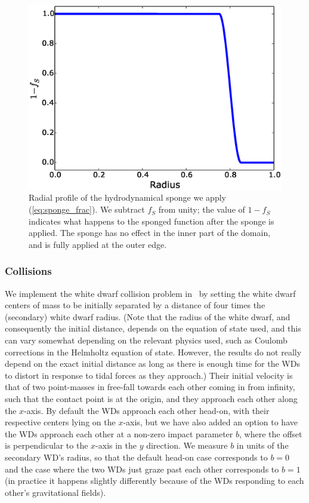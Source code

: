 \documentclass[12pt]{article}
\begin{document}
\begin{figure}
  \centering
  \includegraphics[scale=0.8]{plots/sponge}
  \caption[Radial profile of the hydrodynamical sponge]
          {Radial profile of the hydrodynamical sponge we apply (\autoref{eq:sponge_frac}). 
           We subtract $f_S$ from unity; the value of $1 - f_S$ indicates what happens 
           to the sponged function after the sponge is applied. The sponge has no effect 
           in the inner part of the domain, and is fully applied at the outer edge.
           \label{fig:sponge}
          }
\end{figure}


\clearpage
\subsubsection{Collisions}
\label{sec:initial_state:collisions}

We implement the white dwarf collision problem in \castro\ by setting the white dwarf
centers of mass to be initially separated by a distance of four times
the (secondary) white dwarf radius. (Note that the radius of the white dwarf, and
consequently the initial distance, depends on the equation of state used, and this
can vary somewhat depending on the relevant physics used, such as Coulomb corrections
in the Helmholtz equation of state. However, the results do not really depend on the
exact initial distance as long as there is enough time for the WDs to distort in
response to tidal forces as they approach.) Their initial velocity is that of
two point-masses in free-fall towards each other coming in from infinity, such that
the contact point is at the origin, and they approach each other along the $x$-axis.
By default the WDs approach each other head-on, with their respective centers
lying on the $x$-axis, but we have also added an option
to have the WDs approach each other at a non-zero impact parameter $b$, where the
offset is perpendicular to the $x$-axis in the $y$ direction. We measure
$b$ in units of the secondary WD's radius, so that the default head-on case
corresponds to $b = 0$ and the case where the two WDs just graze past each other
corresponds to $b = 1$ (in practice it happens slightly differently because
of the WDs responding to each other's gravitational fields).
\end{document}
